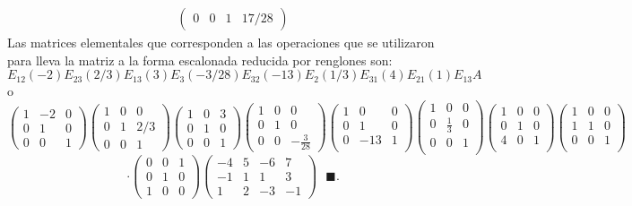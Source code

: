 \documentclass[11pt,letterpaper]{article}
\newcommand{\finf}{\blacksquare.}
\begin{document}
\begin{enumerate}
\begin{equation*}
\begin{array}{c}
\begin{pmatrix}
0 &  0 & 1 & 17/28
\end{pmatrix}
\end{array}
\end{equation*}
Las matrices elementales que corresponden a las operaciones que se utilizaron para lleva la matriz a la forma escalonada reducida por renglones son:
$$E_{12}(-2)E_{23}(2/3)E_{13}(3)E_3(-3/28)E_{32}(-13)E_2(1/3)E_{31}(4)E_{21}(1)E_{13}A$$
o
$$\begin{pmatrix}
1 & -2 & 0\\
0 & 1 & 0\\
0 & 0 & 1
\end{pmatrix}
\begin{pmatrix}
1 & 0 & 0\\
0 & 1 & 2/3\\
0 & 0 & 1
\end{pmatrix}
\begin{pmatrix}
1 & 0 & 3\\
0 & 1 & 0\\
0 & 0 & 1
\end{pmatrix}
\begin{pmatrix}
1 & 0 & 0\\
0 & 1 & 0\\
0 & 0 & -\frac{3}{28}
\end{pmatrix} \begin{pmatrix}
1 & 0 & 0\\
0 & 1 & 0\\
0 & -13 & 1\\
\end{pmatrix} \begin{pmatrix}
1 & 0 & 0 \\
0 &\frac{1}{3} & 0 \\
0 & 0 & 1 \\
\end{pmatrix} \begin{pmatrix}
1 & 0 & 0\\
0 & 1 & 0\\
4 & 0 & 1\\
\end{pmatrix} \begin{pmatrix}
1 & 0 & 0\\
1 & 1 & 0\\
0 & 0 & 1\\
\end{pmatrix}$$
$$\cdot \begin{pmatrix}
0 & 0 & 1\\
0 & 1 & 0\\
1 & 0 & 0
\end{pmatrix}\begin{pmatrix}
-4 & 5 & -6 &7\\
-1 & 1 &  1 &3\\
1  & 2 & -3 &-1
\end{pmatrix}\ \ \ \finf$$


\end{enumerate}
\end{document}
